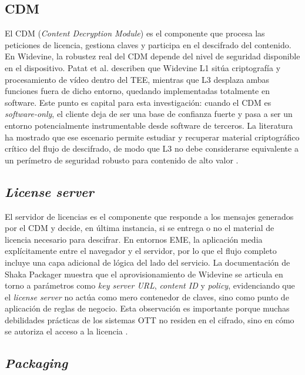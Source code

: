\subsection{CDM}

El CDM (\textit{Content Decryption Module}) es el componente que procesa las peticiones de licencia, gestiona claves y participa en el descifrado del contenido. En Widevine, la robustez real del CDM depende del nivel de seguridad disponible en el dispositivo. Patat et al. describen que Widevine L1 sitúa criptografía y procesamiento de vídeo dentro del TEE, mientras que L3 desplaza ambas funciones fuera de dicho entorno, quedando implementadas totalmente en software. Este punto es capital para esta investigación: cuando el CDM es \textit{software-only}, el cliente deja de ser una base de confianza fuerte y pasa a ser un entorno potencialmente instrumentable desde software de terceros. La literatura ha mostrado que ese escenario permite estudiar y recuperar material criptográfico crítico del flujo de descifrado, de modo que L3 no debe considerarse equivalente a un perímetro de seguridad robusto para contenido de alto valor \cite{patat2022,rafi2023mobiledrm,widevine2024}.

\subsection{\textit{License server}}

El servidor de licencias es el componente que responde a los mensajes generados por el CDM y decide, en última instancia, si se entrega o no el material de licencia necesario para descifrar. En entornos EME, la aplicación media explícitamente entre el navegador y el servidor, por lo que el flujo completo incluye una capa adicional de lógica del lado del servicio. La documentación de Shaka Packager muestra que el aprovisionamiento de Widevine se articula en torno a parámetros como \textit{key server URL}, \textit{content ID} y \textit{policy}, evidenciando que el \textit{license server} no actúa como mero contenedor de claves, sino como punto de aplicación de reglas de negocio. Esta observación es importante porque muchas debilidades prácticas de los sistemas OTT no residen en el cifrado, sino en cómo se autoriza el acceso a la licencia \cite{w3ceme2026,shaka-packager-drm,widevine2024}.

\subsection{\textit{Packaging}}

